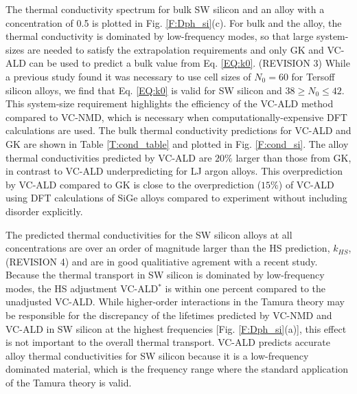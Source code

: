 \documentclass[12pt,twocolumn,iop]{/usr/share/texmf/tex/latex/iop/iopart}[/usr/share/texmf/tex/latex/iop/]
\begin{document}
The thermal conductivity spectrum for bulk SW silicon and an alloy 
with a concentration of 0.5 is plotted in Fig. \ref{F:Dph_si}(c). 
For bulk and the alloy, the thermal conductivity is dominated by 
low-frequency modes, so that large system-sizes are needed to satisfy 
the extrapolation requirements and only GK and VC-ALD can be used to 
predict a bulk value from Eq. \eqref{EQ:k0}. (REVISION 3) While a previous 
study found it was necessary to use cell sizes of $N_0 = 60$ for Tersoff silicon 
alloys,\cite{he_morphology_2011} we find that  
Eq. \eqref{EQ:k0} is valid for SW silicon and $38 \ge N_0 \le 42$. 
This system-size requirement highlights the efficiency of the 
VC-ALD method compared to VC-NMD, which is necessary when 
computationally-expensive DFT calculations are used.
\cite{esfarjani_method_2008,garg_role_2011,tian_phonon_2012,lindsay_thermal_2012,esfarjani_heat_2011,chaput_phonon-phonon_2011}
The bulk thermal conductivity 
predictions for VC-ALD and GK are shown in Table \ref{T:cond_table} and 
plotted in Fig. \ref{F:cond_si}. The alloy thermal conductivities predicted 
by VC-ALD are $20\%$ larger than those from GK, in contrast to VC-ALD 
underpredicting for LJ argon alloys. This overprediction 
by VC-ALD compared to GK is close to the overprediction ($15\%$) of VC-ALD 
using DFT calculations of SiGe alloys compared to experiment 
without including disorder explicitly.\cite{garg_role_2011} 

The predicted thermal conductivities for the SW silicon alloys at 
all concentrations are over an order of magnitude larger than
the HS prediction, $k_{HS}$, (REVISION 4) and are in good qualitiative agrement 
with a recent study.\cite{hori_phonon_2013} 
Because the thermal transport in SW silicon 
is dominated by low-frequency modes, the HS adjustment  
VC-ALD$^*$ is within one percent compared 
to the unadjusted VC-ALD. 
While higher-order interactions in the Tamura theory 
may be responsible for the 
discrepancy of the lifetimes predicted by VC-NMD and VC-ALD in SW silicon 
at the highest frequencies [Fig. \ref{F:Dph_si}(a)],  
this effect is not important to the overall
thermal transport. VC-ALD predicts accurate alloy thermal 
conductivities for SW silicon because it is a low-frequency 
dominated material, which is the frequency range where the standard 
application of the Tamura theory is valid.\cite{tamura_isotope_1983} 
\end{document}
